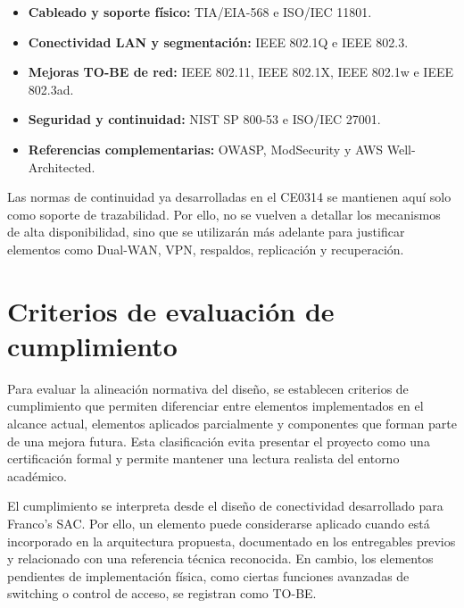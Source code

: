 \documentclass[11pt, a4paper, oneside]{report}
\begin{document}
\begin{itemize}
    \item \textbf{Cableado y soporte físico:} TIA/EIA-568 e ISO/IEC 11801.
    \item \textbf{Conectividad LAN y segmentación:} IEEE 802.1Q e IEEE 802.3.
    \item \textbf{Mejoras TO-BE de red:} IEEE 802.11, IEEE 802.1X, IEEE 802.1w e IEEE 802.3ad.
    \item \textbf{Seguridad y continuidad:} NIST SP 800-53 e ISO/IEC 27001.
    \item \textbf{Referencias complementarias:} OWASP, ModSecurity y AWS Well-Architected.
\end{itemize}

Las normas de continuidad ya desarrolladas en el CE0314 se mantienen aquí solo como soporte de trazabilidad. Por ello, no se vuelven a detallar los mecanismos de alta disponibilidad, sino que se utilizarán más adelante para justificar elementos como Dual-WAN, VPN, respaldos, replicación y recuperación.

\section{Criterios de evaluación de cumplimiento}

Para evaluar la alineación normativa del diseño, se establecen criterios de cumplimiento que permiten diferenciar entre elementos implementados en el alcance actual, elementos aplicados parcialmente y componentes que forman parte de una mejora futura. Esta clasificación evita presentar el proyecto como una certificación formal y permite mantener una lectura realista del entorno académico.

El cumplimiento se interpreta desde el diseño de conectividad desarrollado para Franco's SAC. Por ello, un elemento puede considerarse aplicado cuando está incorporado en la arquitectura propuesta, documentado en los entregables previos y relacionado con una referencia técnica reconocida. En cambio, los elementos pendientes de implementación física, como ciertas funciones avanzadas de switching o control de acceso, se registran como TO-BE.

\renewcommand{\arraystretch}{1.3}
\footnotesize
{}
\end{document}
